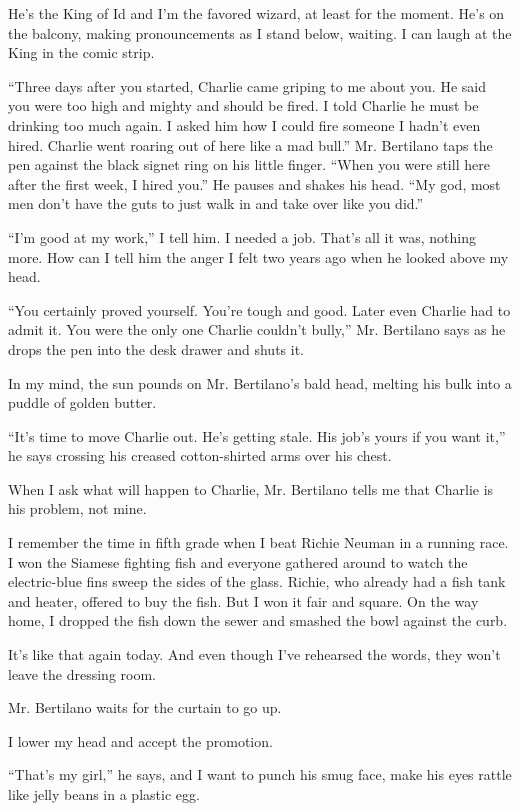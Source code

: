 \documentclass[
]{article}
\begin{document}
He's the King of Id and I'm the favored wizard, at least for the moment.
He's on the balcony, making pronouncements as I stand below, waiting. I
can laugh at the King in the comic strip.

``Three days after you started, Charlie came griping to me about you. He
said you were too high and mighty and should be fired. I told Charlie he
must be drinking too much again. I asked him how I could fire someone I
hadn't even hired. Charlie went roaring out of here like a mad bull.''
Mr. Bertilano taps the pen against the black signet ring on his little
finger. ``When you were still here after the first week, I hired you.''
He pauses and shakes his head. ``My god, most men don't have the guts to
just walk in and take over like you did.''

``I'm good at my work,'' I tell him. I needed a job. That's all it was,
nothing more. How can I tell him the anger I felt two years ago when he
looked above my head.

``You certainly proved yourself. You're tough and good. Later even
Charlie had to admit it. You were the only one Charlie couldn't bully,''
Mr. Bertilano says as he drops the pen into the desk drawer and shuts
it.

In my mind, the sun pounds on Mr. Bertilano's bald head, melting his
bulk into a puddle of golden butter.

``It's time to move Charlie out. He's getting stale. His job's yours if
you want it,'' he says cross­ing his creased cotton-shirted arms over
his chest.

When I ask what will happen to Charlie, Mr. Bertilano tells me that
Charlie is his problem, not mine.

I remember the time in fifth grade when I beat Richie Neuman in a
running race. I won the Siamese fighting fish and everyone gathered
around to watch the electric-blue fins sweep the sides of the glass.
Richie, who already had a fish tank and heater, offered to buy the fish.
But I won it fair and square. On the way home, I dropped the fish down
the sewer and smashed the bowl against the curb.

It's like that again today. And even though I've rehearsed the words,
they won't leave the dressing room.

Mr. Bertilano waits for the curtain to go up.

I lower my head and accept the promotion.

``That's my girl,'' he says, and I want to punch his smug face, make his
eyes rattle like jelly beans in a plastic egg.
\end{document}
